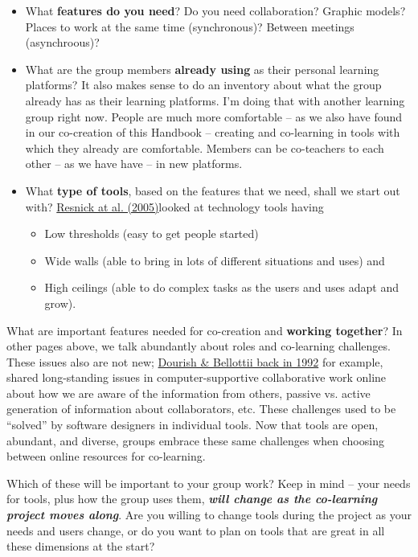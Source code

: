 \begin{itemize}
\item
  What \textbf{features do you need}? Do you need collaboration? Graphic
  models? Places to work at the same time (synchronous)? Between
  meetings (asynchroous)?
\item
  What are the group members \textbf{already using} as their personal
  learning platforms? It also makes sense to do an inventory about what
  the group already has as their learning platforms. I'm doing that with
  another learning group right now. People are much more comfortable --
  as we also have found in our co-creation of this Handbook -- creating
  and co-learning in tools with which they already are comfortable.
  Members can be co-teachers to each other -- as we have have -- in new
  platforms.
\item
  What \textbf{type of tools}, based on the features that we need, shall
  we start out with? \href{\#resnick}{Resnick at al. (2005)}looked at
  technology tools having
  \begin{itemize}
  \item
    Low thresholds (easy to get people started)
  \item
    Wide walls (able to bring in lots of different situations and uses)
    and
  \item
    High ceilings (able to do complex tasks as the users and uses adapt
    and grow).
  \end{itemize}
\end{itemize}
What are important features needed for co-creation and \textbf{working
together}? In other pages above, we talk abundantly about roles and
co-learning challenges. These issues also are not new;
\href{\#dourish}{Dourish \& Bellottii back in 1992} for example, shared
long-standing issues in computer-supportive collaborative work online
about how we are aware of the information from others, passive vs.
active generation of information about collaborators, etc. These
challenges used to be ``solved'' by software designers in individual
tools. Now that tools are open, abundant, and diverse, groups embrace
these same challenges when choosing between online resources for
co-learning.

Which of these will be important to your group work? Keep in mind --
your needs for tools, plus how the group uses them, \emph{\textbf{will
change as the co-learning project moves along}}. Are you willing to
change tools during the project as your needs and users change, or do
you want to plan on tools that are great in all these dimensions at the
start?

